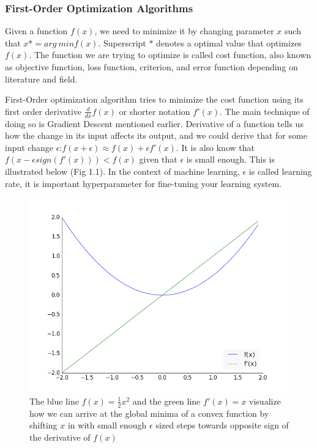 \documentclass[paper=a4, fontsize=11pt]{scrartcl}
\numberwithin{equation}{section}		%
\numberwithin{figure}{section}			%
\numberwithin{table}{section}			%
\begin{document}
	\subsubsection{First-Order Optimization Algorithms}
    Given a function $ f(x) $, we need to minimize it by changing parameter $ x $ such that $ x* = arg\ min f(x)$. Superscript $*$ denotes a optimal value that optimizes $f(x)$. The function we are trying to optimize is called cost function, also known as objective function, loss function, criterion, and error function depending on literature and field. \par 
    First-Order optimization algorithm tries to minimize the cost function using its first order derivative $\frac{d}{dx}f(x)$ or shorter notation $f'(x)$. The main technique of doing so is Gradient Descent mentioned earlier. Derivative of a function tells us how the change in its input affects its output, and we could derive that for some input change $\epsilon $:\newline $f(x + \epsilon) \approx f(x) + \epsilon f'(x)$. It is also know that $ f(x - \epsilon sign(f'(x)) )  < f(x) $ given that $\epsilon$ is small enough. This is illustrated below (Fig 1.1). In the context of machine learning, $\epsilon$ is called learning rate, it is important hyperparameter for fine-tuning your learning system. \par
    
\begin{figure}[!htb]
	\centering
    \includegraphics[scale=0.6]{gradient_descent.png}
    \caption{The blue line $ f(x) = \frac{1}{2}x^2$ and the green line $f'(x) = x $ visualize how we can arrive at the global minima of a convex function by shifting $x$ in with small enough $\epsilon$ sized steps towards opposite sign of the derivative of $f(x)$}
    \label{fig:fx_dfdx}
\end{figure}
\end{document}
